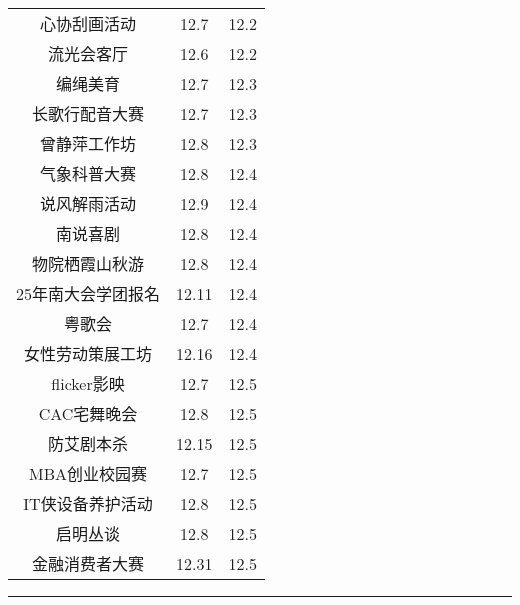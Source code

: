 \documentclass[letterpaper, 12pt]{article}
\begin{document}
\begin{multicols}{2}
{\begin{longtable}{|c|c|c|}
    心协刮画活动 & 12.7 & 12.2\\
    流光会客厅 & 12.6 & 12.2\\
    编绳美育 & 12.7 & 12.3\\
    长歌行配音大赛 & 12.7 & 12.3\\
    曾静萍工作坊 & 12.8 & 12.3\\
    气象科普大赛 & 12.8 & 12.4\\
    说风解雨活动 & 12.9 & 12.4\\
    南说喜剧 & 12.8 & 12.4\\
    物院栖霞山秋游 & 12.8 & 12.4\\
    25年南大会学团报名 & 12.11 & 12.4\\
    粤歌会 & 12.7 & 12.4\\
    女性劳动策展工坊 & 12.16 & 12.4\\
    flicker影映 & 12.7 & 12.5\\
    CAC宅舞晚会 & 12.8 & 12.5\\
    防艾剧本杀 & 12.15 & 12.5\\
    MBA创业校园赛 & 12.7 & 12.5\\
    IT侠设备养护活动 & 12.8 & 12.5\\
    启明丛谈 & 12.8 & 12.5\\
    金融消费者大赛 & 12.31 & 12.5\\
    \hline
\end{longtable}
\unskip
\unpenalty
\unpenalty}\unvbox\colbbox
\end{multicols}
\hrule
\pagebreak
\end{document}
